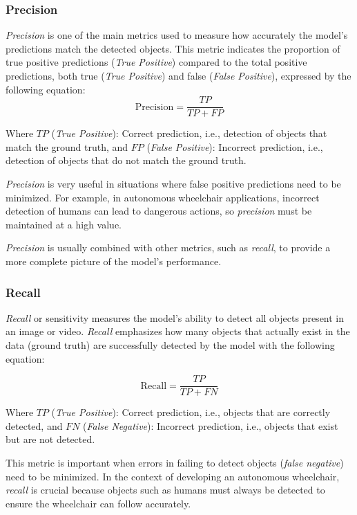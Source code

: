 \subsubsection{Precision}
\label{subsubsec:precision}

\emph{Precision} is one of the main metrics used to measure how accurately the model's predictions match the detected objects. This metric indicates the proportion of true positive predictions (\emph{True Positive}) compared to the total positive predictions, both true (\emph{True Positive}) and false (\emph{False Positive}), expressed by the following equation:
\begin{equation}
  \mathrm{Precision} = \frac{TP}{TP + FP}
\end{equation}

Where \(TP\) (\emph{True Positive}): Correct prediction, i.e., detection of objects that match the ground truth, and \(FP\) (\emph{False Positive}): Incorrect prediction, i.e., detection of objects that do not match the ground truth.

\emph{Precision} is very useful in situations where false positive predictions need to be minimized. For example, in autonomous wheelchair applications, incorrect detection of humans can lead to dangerous actions, so \emph{precision} must be maintained at a high value.

\emph{Precision} is usually combined with other metrics, such as \emph{recall}, to provide a more complete picture of the model's performance.

\subsubsection{Recall}
\label{subsubsec:recall}

\emph{Recall} or sensitivity measures the model's ability to detect all objects present in an image or video. \emph{Recall} emphasizes how many objects that actually exist in the data (ground truth) are successfully detected by the model with the following equation:

\begin{equation}
  \mathrm{Recall} = \frac{TP}{TP + FN}
\end{equation}

Where \(TP\) (\emph{True Positive}): Correct prediction, i.e., objects that are correctly detected, and \(FN\) (\emph{False Negative}): Incorrect prediction, i.e., objects that exist but are not detected.

This metric is important when errors in failing to detect objects (\emph{false negative}) need to be minimized. In the context of developing an autonomous wheelchair, \emph{recall} is crucial because objects such as humans must always be detected to ensure the wheelchair can follow accurately.

